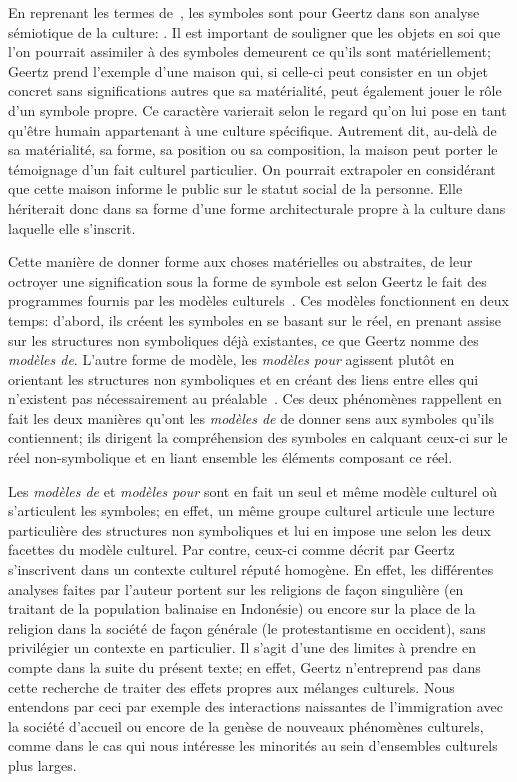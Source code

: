 En reprenant les termes de~\citet{Langer1962}, les symboles sont pour Geertz dans son analyse sémiotique de la culture: .
Il est important de souligner que les objets en soi que l'on pourrait assimiler à des symboles demeurent ce qu'ils sont matériellement; Geertz prend l'exemple d'une maison qui, si celle-ci peut consister en un objet concret sans significations autres que sa matérialité, peut également jouer le rôle d'un symbole propre.
Ce caractère varierait selon le regard qu'on lui pose en tant qu'être humain appartenant à une culture spécifique.
Autrement dit, au-delà de sa matérialité, sa forme, sa position ou sa composition, la maison peut porter le témoignage d'un fait culturel particulier.
On pourrait extrapoler en considérant que cette maison informe le public sur le statut social de la personne.
Elle hériterait donc dans sa forme d'une forme architecturale propre à la culture dans laquelle elle s'inscrit.

Cette manière de donner forme aux choses matérielles ou abstraites, de leur octroyer une signification sous la forme de symbole est selon Geertz le fait des programmes fournis par les modèles culturels~\citep[25]{Geertz1972}.
Ces modèles fonctionnent en deux temps: d'abord, ils créent les symboles en se basant sur le réel, en prenant assise sur les structures non symboliques déjà existantes, ce que Geertz nomme des \emph{modèles de}.
L'autre forme de modèle, les \emph{modèles pour} agissent plutôt en orientant les structures non symboliques et en créant des liens entre elles qui n'existent pas nécessairement au préalable~\citep[26--27]{Geertz1972}.
Ces deux phénomènes rappellent en fait les deux manières qu'ont les \emph{modèles de} de donner sens aux symboles qu'ils contiennent; ils dirigent la compréhension des symboles en calquant ceux-ci sur le réel non-symbolique et en liant ensemble les éléments composant ce réel.

Les \emph{modèles de} et \emph{modèles pour} sont en fait un seul et même modèle culturel où s'articulent les symboles; en effet, un même groupe culturel articule une lecture particulière des structures non symboliques et lui en impose une selon les deux facettes du modèle culturel.
Par contre, ceux-ci comme décrit par Geertz s'inscrivent dans un contexte culturel réputé homogène.
En effet, les différentes analyses faites par l'auteur portent sur les religions  de façon singulière (en traitant de la population balinaise en Indonésie) ou encore sur la place de la religion dans la société de façon générale (le protestantisme en occident), sans privilégier un contexte en particulier.
Il s'agit d'une des limites à prendre en compte dans la suite du présent texte; en effet, Geertz n'entreprend pas dans cette recherche de traiter des effets propres aux mélanges culturels.
Nous entendons par ceci par exemple des interactions naissantes de l'immigration avec la société d'accueil ou encore de la genèse de nouveaux phénomènes culturels, comme dans le cas qui nous intéresse les minorités \lgbt{} au sein d'ensembles culturels plus larges.

